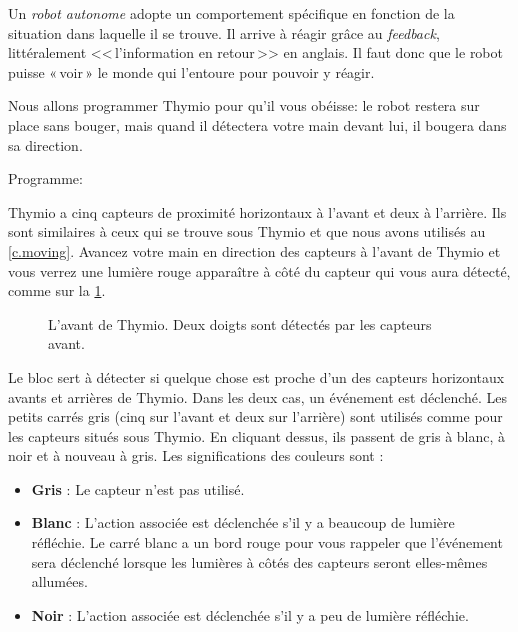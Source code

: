 \label{ch.pet}

Un \emph{robot autonome} adopte un comportement spécifique en fonction de la situation dans laquelle il se trouve.
Il arrive à réagir grâce au \textit{feedback}, littéralement <<\,l'information en retour\,>> en anglais.
Il faut donc que le robot puisse «\,voir\,» le monde qui l'entoure pour pouvoir y réagir.


Nous allons programmer Thymio pour qu'il vous obéisse:
le robot restera sur place sans bouger, mais quand il détectera votre main devant lui, il bougera dans sa direction.

{\raggedleft \hfill Programme: }

Thymio a cinq capteurs de proximité horizontaux à l'avant et deux à l'arrière.
Ils sont similaires à ceux qui se trouve sous Thymio et que nous avons utilisés au \cref{c.moving}.
Avancez votre main en direction des capteurs à l'avant de Thymio et vous verrez une lumière rouge apparaître à côté du capteur qui vous aura détecté, comme sur la \cref{fig.detect}.

\begin{figure}
\begin{center}
\caption{L'avant de Thymio. Deux doigts sont détectés par les capteurs avant.}\label{fig.detect}
\end{center}
\end{figure}

Le bloc  sert à détecter si quelque chose est proche d'un des capteurs horizontaux avants et arrières de Thymio.
Dans les deux cas, un événement est déclenché.
Les petits carrés gris (cinq sur l'avant et deux sur l'arrière) sont utilisés comme pour les capteurs situés sous Thymio.
En cliquant dessus, ils passent de gris à blanc, à noir et à nouveau à gris.
Les significations des couleurs sont :

\begin{itemize}
\item \textbf{Gris} : Le capteur n'est pas utilisé.
\item \textbf{Blanc} : L'action associée est déclenchée s'il y a beaucoup de lumière réfléchie.
Le carré blanc a un bord rouge pour vous rappeler que l'événement sera déclenché lorsque les lumières à côtés des capteurs seront elles-mêmes allumées.
\item \textbf{Noir} : L'action associée est déclenchée s'il y a peu de lumière réfléchie.
\end{itemize}


